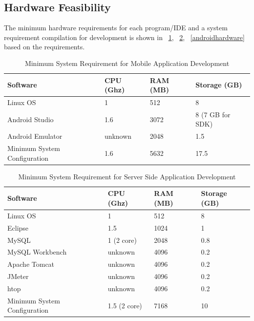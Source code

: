 \subsection{Hardware Feasibility}
The minimum hardware requirements for each program/IDE and
a system requirement compilation for development is shown in ~\ref{minreqmobile}, ~\ref{minreqserver}, ~\ref{androidhardware} based on the requirements.

\begin{table}[!ht]
\centering
\caption{Minimum System Requirement for Mobile Application Development}
\label{minreqmobile}
\begin{tabular}{|l|l|l|l|}
\hline
\textbf{Software}& \textbf{CPU (Ghz)} & \textbf{RAM (MB)}  & \textbf{Storage (GB)} \\ \hline
Linux OS \cite{linuxMinimumSystemRequirements} & \hfill 1 & \hfill 512 & \hfill 8 \\ \hline
Android Studio \cite{androidMinimumSystemRequirements} & \hfill 1.6 & \hfill 3072  & \hfill 8 (7 GB for SDK)\\ \hline
Android Emulator \cite{androidMinimumSystemRequirements} & \hfill unknown & \hfill 2048 & \hfill 1.5 \\ \hline
Minimum System Configuration & \hfill 1.6 & \hfill 5632 & \hfill 17.5 \\ \hline
\end{tabular}
\end{table}

\begin{table}[!ht]
\centering
\caption{Minimum System Requirement for Server Side Application Development}
\label{minreqserver}
\begin{tabular}{|l|l|l|l|}
\hline
\textbf{Software}& \textbf{CPU (Ghz)} & \textbf{RAM (MB)}  & \textbf{Storage (GB)} \\ \hline
Linux OS \cite{linuxMinimumSystemRequirements} & \hfill 1 & \hfill 512 & \hfill 8 \\ \hline
Eclipse \cite{eclipse} & \hfill 1.5 & \hfill 1024  & \hfill 1  \\ \hline
MySQL \cite{mysql} & \hfill 1 (2 core) & \hfill 2048 & \hfill 0.8 \\ \hline
MySQL Workbench\cite{mysql} & \hfill unknown & \hfill 4096 & \hfill 0.2 \\ \hline
Apache Tomcat\cite{mysql} & \hfill unknown & \hfill 4096 & \hfill 0.2 \\ \hline
JMeter\cite{mysql} & \hfill unknown & \hfill 4096 & \hfill 0.2 \\ \hline
htop\cite{mysql} & \hfill unknown & \hfill 4096 & \hfill 0.2 \\ \hline
Minimum System Configuration & \hfill 1.5 (2 core) & \hfill 7168 & \hfill 10 \\ \hline
\end{tabular}
\end{table}

